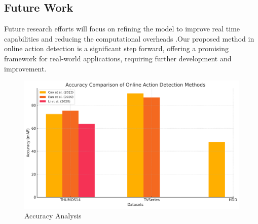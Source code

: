 {\subsection{Future Work
}
Future research efforts will focus on refining the model to improve real time capabilities  and reducing the computational overheads .Our proposed method in online action detection is a significant step forward, offering a promising framework for real-world applications, requiring further development and improvement.
}
\vspace{12pt}
\vspace{12pt}
\vspace{12pt}

\begin{figure}[htbp]
    \centering
    \includegraphics[width=5in]{img/acuracy.png}
    \caption{Accuracy Analysis}
    \label{fig:example}
\end{figure}

